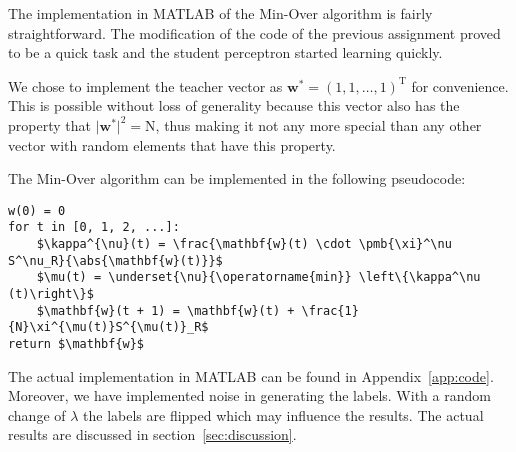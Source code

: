 The implementation in MATLAB of the Min-Over algorithm is fairly straightforward. The modification of the code of the previous assignment proved to be a quick task and the student perceptron started learning quickly. 

We chose to implement the teacher vector as $\mathbf{w}^{*} = (1, 1, \ldots,1)^\text{T}$ for convenience. This is possible without loss of generality because this vector also has the property that $\big|\mathbf{w}^{*}\big|^2 = \text{N}$, thus making it not any more special than any other vector with random elements that have this property.

The Min-Over algorithm can be implemented in the following pseudocode:
\begin{lstlisting}[mathescape]
w(0) = 0
for t in [0, 1, 2, ...]:
	$\kappa^{\nu}(t) = \frac{\mathbf{w}(t) \cdot \pmb{\xi}^\nu S^\nu_R}{\abs{\mathbf{w}(t)}}$
	$\mu(t) = \underset{\nu}{\operatorname{min}} \left\{\kappa^\nu (t)\right\}$
	$\mathbf{w}(t + 1) = \mathbf{w}(t) + \frac{1}{N}\xi^{\mu(t)}S^{\mu(t)}_R$
return $\mathbf{w}$
\end{lstlisting}

The actual implementation in MATLAB can be found in Appendix~\ref{app:code}. Moreover, we have implemented noise in generating the labels. With a random change of $\lambda$ the labels are flipped which may influence the results. The actual results are discussed in section~\ref{sec:discussion}.
